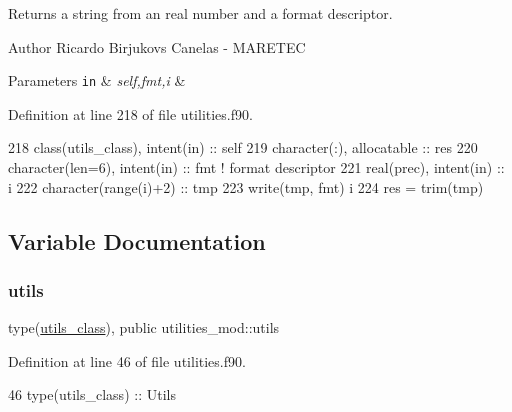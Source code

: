 Returns a string from an real number and a format descriptor. 

\begin{DoxyAuthor}{Author}
Ricardo Birjukovs Canelas -\/ M\+A\+R\+E\+T\+EC 
\end{DoxyAuthor}

\begin{DoxyParams}[1]{Parameters}
\mbox{\tt in}  & {\em self,fmt,i} & \\
\hline
\end{DoxyParams}


Definition at line 218 of file utilities.\+f90.


\begin{DoxyCode}
218     \textcolor{keywordtype}{class}(utils\_class), \textcolor{keywordtype}{intent(in)} :: self
219     \textcolor{keywordtype}{character(:)}, \textcolor{keywordtype}{allocatable} :: res
220     \textcolor{keywordtype}{character(len=6)}, \textcolor{keywordtype}{intent(in)} :: fmt \textcolor{comment}{! format descriptor}
221     \textcolor{keywordtype}{real(prec)}, \textcolor{keywordtype}{intent(in)} :: i
222     \textcolor{keywordtype}{character(range(i)+2)} :: tmp
223     \textcolor{keyword}{write}(tmp, fmt) i
224     res = trim(tmp)
\end{DoxyCode}


\subsection{Variable Documentation}
\mbox{\label{namespaceutilities__mod_aa12c2506b3107528a2511d059186f12d}} 
\subsubsection{\texorpdfstring{utils}{utils}}
{\footnotesize\ttfamily type(\mbox{\hyperlink{structutilities__mod_1_1utils__class}{utils\+\_\+class}}), public utilities\+\_\+mod\+::utils}



Definition at line 46 of file utilities.\+f90.


\begin{DoxyCode}
46     \textcolor{keywordtype}{type}(utils\_class) :: Utils
\end{DoxyCode}
